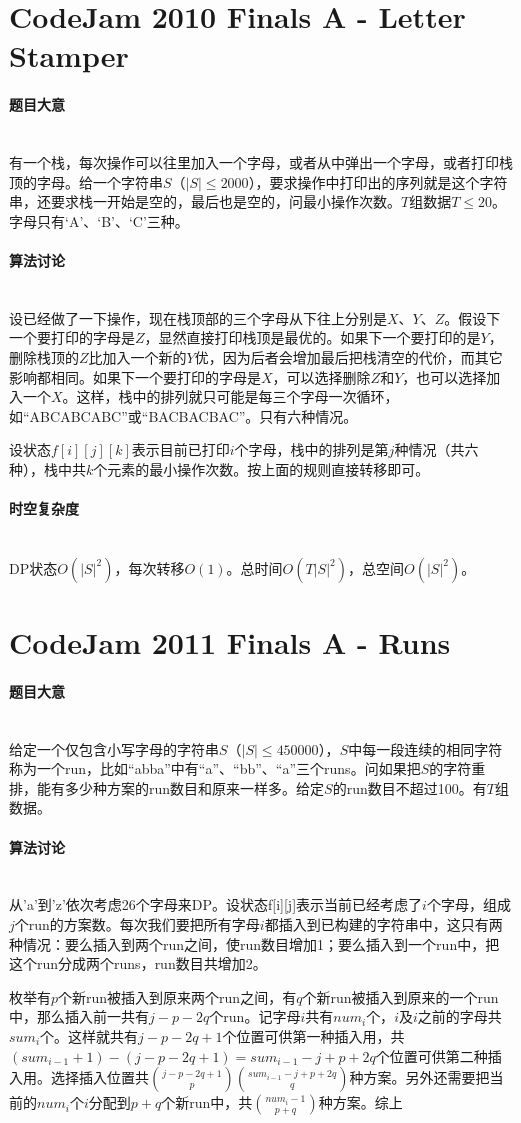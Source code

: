\documentclass[UTF8]{ctexart}
\newcommand{\myparagraph}[1]{\paragraph{#1}\mbox{}\\}
\theoremstyle{nonumberplain}
\begin{document}
	\section{CodeJam 2010 Finals A - Letter Stamper}
	
		\myparagraph{题目大意}
		
			有一个栈，每次操作可以往里加入一个字母，或者从中弹出一个字母，或者打印栈顶的字母。给一个字符串$S$（$|S| \leq 2000$），要求操作中打印出的序列就是这个字符串，还要求栈一开始是空的，最后也是空的，问最小操作次数。$T$组数据$T \leq 20$。字母只有‘A’、‘B’、‘C’三种。
		
		\myparagraph{算法讨论}
		
			设已经做了一下操作，现在栈顶部的三个字母从下往上分别是$X$、$Y$、$Z$。假设下一个要打印的字母是$Z$，显然直接打印栈顶是最优的。如果下一个要打印的是$Y$，删除栈顶的$Z$比加入一个新的$Y$优，因为后者会增加最后把栈清空的代价，而其它影响都相同。如果下一个要打印的字母是$X$，可以选择删除$Z$和$Y$，也可以选择加入一个$X$。这样，栈中的排列就只可能是每三个字母一次循环，如“ABCABCABC”或“BACBACBAC”。只有六种情况。
			
			设状态$f[i][j][k]$表示目前已打印$i$个字母，栈中的排列是第$j$种情况（共六种），栈中共$k$个元素的最小操作次数。按上面的规则直接转移即可。
		
		\myparagraph{时空复杂度}
		
			DP状态$O(|S|^2)$，每次转移$O(1)$。总时间$O(T|S|^2)$，总空间$O(|S|^2)$。
	
	\section{CodeJam 2011 Finals A - Runs}
	
		\myparagraph{题目大意}
		
			给定一个仅包含小写字母的字符串$S$（$|S| \leq 450000$），$S$中每一段连续的相同字符称为一个run，比如“abba”中有“a”、“bb”、“a”三个runs。问如果把$S$的字符重排，能有多少种方案的run数目和原来一样多。给定$S$的run数目不超过100。有$T$组数据。
		
		\myparagraph{算法讨论}
		
			从'a'到'z'依次考虑26个字母来DP。设状态f[i][j]表示当前已经考虑了$i$个字母，组成$j$个run的方案数。每次我们要把所有字母$i$都插入到已构建的字符串中，这只有两种情况：要么插入到两个run之间，使run数目增加1；要么插入到一个run中，把这个run分成两个runs，run数目共增加2。
			
			枚举有$p$个新run被插入到原来两个run之间，有$q$个新run被插入到原来的一个run中，那么插入前一共有$j-p-2q$个run。记字母$i$共有$num_i$个，$i$及$i$之前的字母共$sum_i$个。这样就共有$j-p-2q+1$个位置可供第一种插入用，共$(sum_{i-1}+1)-(j-p-2q+1)=sum_{i-1}-j+p+2q$个位置可供第二种插入用。选择插入位置共$\binom{j-p-2q+1}{p}\binom{sum_{i-1}-j+p+2q}{q}$种方案。另外还需要把当前的$num_i$个$i$分配到$p+q$个新run中，共$\binom{num_i-1}{p+q}$种方案。综上
			
\end{document}
